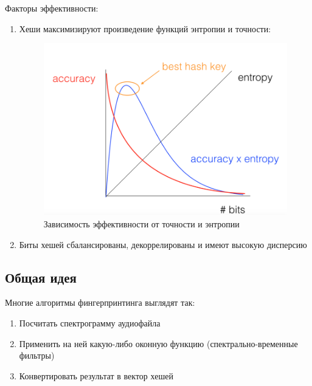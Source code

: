 Факторы эффективности:
\begin{enumerate}[label=\arabic*.]
    \item Хеши максимизируют произведение функций энтропии и точности:
    \begin{figure}[H]
        \begin{center}
            \includegraphics[scale=0.6]{inc/img/best_hp.png}
            \caption{Зависимость эффективности от точности и энтропии}
        \end{center}
    \end{figure}
    \item Биты хешей сбалансированы, декоррелированы и имеют высокую дисперсию
\end{enumerate}

\subsection{Общая идея}
Многие алгоритмы фингерпринтинга выглядят так:
\begin{enumerate}[label=\arabic*.]
        \item Посчитать спектрограмму аудиофайла
        \item Применить на ней какую-либо оконную функцию (спектрально-временные фильтры)
        \item Конвертировать результат в вектор хешей
\end{enumerate}

